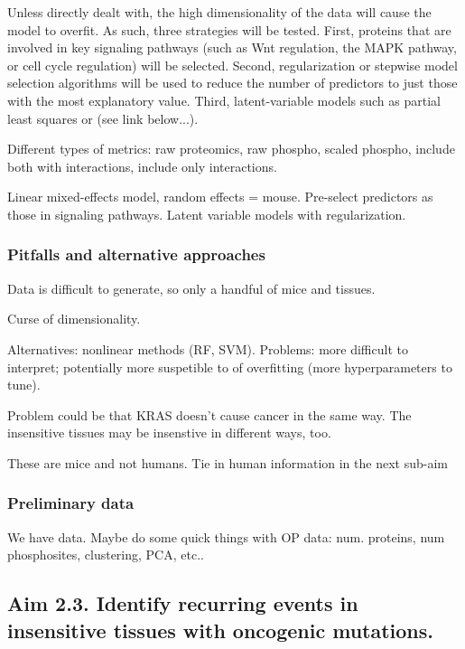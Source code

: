 Unless directly dealt with, the high dimensionality of the data will cause the model to overfit.
As such, three strategies will be tested.
First, proteins that are involved in key signaling pathways (such as Wnt regulation, the MAPK pathway, or cell cycle regulation) will be selected.
Second, regularization or stepwise model selection algorithms will be used to reduce the number of predictors to just those with the most explanatory value.
Third, latent-variable models such as partial least squares or (see link below...).


Different types of metrics: raw proteomics, raw phospho, scaled phospho, include both with interactions, include only interactions.

Linear mixed-effects model, random effects = mouse.
Pre-select predictors as those in signaling pathways.
Latent variable models with regularization.

\subsubsection*{Pitfalls and alternative approaches}

Data is difficult to generate, so only a handful of mice and tissues.

Curse of dimensionality.

Alternatives: nonlinear methods (RF, SVM). Problems: more difficult to interpret; potentially more suspetible to of overfitting (more hyperparameters to tune).

Problem could be that KRAS doesn't cause cancer in the same way.
The insensitive tissues may be insenstive in different ways, too.

These are mice and not humans. Tie in human information in the next sub-aim

\subsubsection*{Preliminary data}

We have data.
Maybe do some quick things with OP data: num. proteins, num phosphosites, clustering, PCA, etc..


\subsection*{Aim 2.3. Identify recurring events in insensitive tissues with oncogenic \KRAS{} mutations.}

